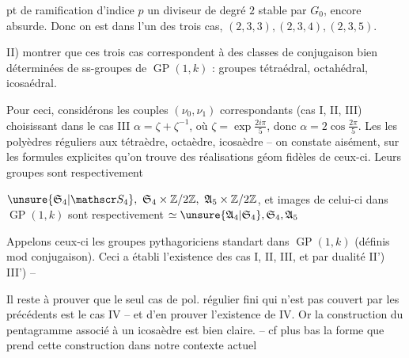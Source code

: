 pt de ramification d'indice $p$ un diviseur de degré $2$ stable par $G_0$, encore absurde. Donc on est dans l'un des trois cas, $(2,3,3),(2,3,4),(2,3,5)$.

II)  montrer que ces trois cas  correspondent à des classes de conjugaison bien déterminées de ss-groupes de $\operatorname{GP}(1,k)$ : groupes tétraédral, octahédral, icosaédral.

Pour ceci, considérons les couples $(\nu_0,\nu_1)$ correspondants (cas I, II, III)  choisissant dans le cas III $\alpha=\zeta+\zeta^{-1}$, où $\zeta=\exp\frac{2i\pi}{5}$, donc $\alpha=2\cos\frac{2\pi}{5}$. Les  les polyèdres réguliers   aux tétraèdre, octaèdre, icosaèdre -- on constate aisément, sur les formules explicites qu'on trouve des réalisations géom  fidèles de ceux-ci. Leurs groupes  sont respectivement

$\unsure{\mathfrak S_4|\mathscr S_4},\ \mathfrak S_4\times\mathbb Z/2\mathbb Z,\ \mathfrak A_5\times\mathbb Z/2\mathbb Z$, et  images de celui-ci dans $\operatorname{GP}(1,k)$  sont respectivement $\simeq\unsure{\mathfrak A_4|\mathfrak S_4},\mathfrak S_4,\mathfrak A_5$

Appelons ceux-ci les groupes pythagoriciens standart dans $\operatorname{GP}(1,k)$ (définis mod conjugaison). Ceci a établi  l'existence des cas I, II, III, et par dualité II') III') -- 

Il reste à prouver que le seul cas de pol. régulier fini qui n'est pas couvert par les précédents est le cas IV -- et d'en prouver l'existence de IV. Or  la construction du pentagramme associé à un icosaèdre est bien claire. -- cf plus bas la forme que prend cette construction dans notre contexte actuel

